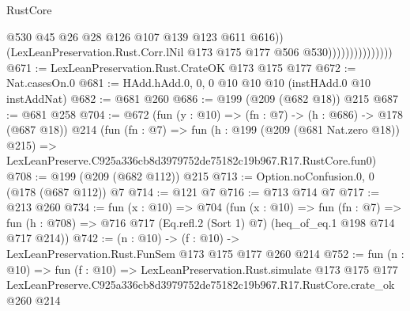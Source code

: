 \begin{lexlean}{RustCore}
\begin{coremodule}
                                    @530
                                    @45
                                    @26
                                    @28
                                    @126
                                    @107
                                    @139
                                    @123
                                    @611
                                    @616))
                                (LexLeanPreservation.Rust.Corr.lNil
                                  @173
                                  @175
                                  @177
                                  @506
                                  @530)))))))))))))))
@671 := LexLeanPreservation.Rust.CrateOK @173 @175 @177
@672 := Nat.casesOn.{0}
@681 := HAdd.hAdd.{0, 0, 0} @10 @10 @10 (instHAdd.{0} @10 instAddNat)
@682 := @681 @260
@686 := @199 (@209 (@682 @18)) @215
@687 := @681 @258
@704 := @672
    (fun (y : @10) => (fn : @7) -> (h : @686) -> @178 (@687 @18))
    @214
    (fun (fn : @7) =>
    fun (h : @199 (@209 (@681 Nat.zero @18)) @215) =>
    LexLeanPreserve.C925a336cb8d3979752de75182c19b967.R17.RustCore.fun0)
@708 := @199 (@209 (@682 @112)) @215
@713 := Option.noConfusion.{0, 0} (@178 (@687 @112)) @7
@714 := @121 @7
@716 := @713 @714 @7
@717 := @213 @260
@734 := fun (x : @10) =>
  @704
    (fun (x : @10) =>
    fun (fn : @7) =>
    fun (h : @708) => @716 @717 (Eq.refl.{2} (Sort 1) @7) (heq_of_eq.{1} @198 @714 @717 @214))
@742 := (n : @10) -> (f : @10) -> LexLeanPreservation.Rust.FunSem @173 @175 @177 @260 @214
@752 := fun (n : @10) =>
  fun (f : @10) =>
  LexLeanPreservation.Rust.simulate
    @173
    @175
    @177
    LexLeanPreserve.C925a336cb8d3979752de75182c19b967.R17.RustCore.crate_ok
    @260
    @214
\end{coremodule}
\end{lexlean}
